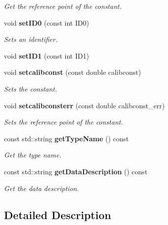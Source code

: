 \begin{DoxyCompactItemize}
\begin{DoxyCompactList}\small\item\em Get the reference point of the constant. \end{DoxyCompactList}\item 
void {\bf set\-I\-D0} (const int I\-D0)\label{classCALICE_1_1ScECALOnePeADC_a774570476ad12dc6b3d0a7badc14f549}

\begin{DoxyCompactList}\small\item\em Sets an identifier. \end{DoxyCompactList}\item 
void {\bfseries set\-I\-D1} (const int I\-D1)\label{classCALICE_1_1ScECALOnePeADC_a9bfb79f13a293224f25d5978b26113d3}

\item 
void {\bf setcalibconst} (const double calibconst)\label{classCALICE_1_1ScECALOnePeADC_af725aac44a808a4b26554bcf3bd02d8d}

\begin{DoxyCompactList}\small\item\em Sets the constant. \end{DoxyCompactList}\item 
void {\bf setcalibconsterr} (const double calibconst\-\_\-err)\label{classCALICE_1_1ScECALOnePeADC_a2600303815a54840929c50845983d020}

\begin{DoxyCompactList}\small\item\em Sets the reference point of the constant. \end{DoxyCompactList}\item 
const std\-::string {\bf get\-Type\-Name} () const 
\begin{DoxyCompactList}\small\item\em Get the type name. \end{DoxyCompactList}\item 
const std\-::string {\bf get\-Data\-Description} () const 
\begin{DoxyCompactList}\small\item\em Get the data description. \end{DoxyCompactList}\end{DoxyCompactItemize}


\subsection{Detailed Description}


